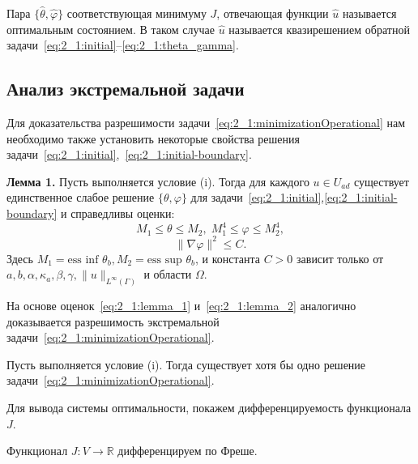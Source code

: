 Пара $\{\hat{\theta}, \hat{\varphi} \}$ соответствующая минимуму $J$,
отвечающая функции $\hat{u}$ называется оптимальным состоянием.
В таком случае $\hat{u}$ называется квазирешением обратной
задачи~\eqref{eq:2_1:initial}--\eqref{eq:2_1:theta_gamma}.

\subsection{Анализ экстремальной задачи}\label{subsec:ch2/sec1/subsec3}


Для доказательства разрешимости задачи~\eqref{eq:2_1:minimizationOperational}
нам необходимо также установить некоторые свойства
решения задачи~\eqref{eq:2_1:initial},~\eqref{eq:2_1:initial-boundary}.

\textbf{Лемма 1.}
Пусть выполняется условие (i).
Тогда для каждого $ u \in U_{ad} $ существует единственное слабое решение
$\{\theta, \varphi \}$ для задачи~\eqref{eq:2_1:initial},\eqref{eq:2_1:initial-boundary}
и справедливы оценки:
\begin{equation}
    \label{eq:2_1:lemma_1}
    M_1 \le \theta \le M_2, \; M_1^4 \le \varphi \le M_2^4,
\end{equation}
\begin{equation}
    \label{eq:2_1:lemma_2}
    \| \nabla \varphi \|^2 \le C.
\end{equation}
Здесь $M_1 = \text{ess inf } \theta_b, M_2 = \text{ess sup } \theta_b$, и константа $C > 0$ зависит
только от \\ $a, b, \alpha, \kappa_a, \beta, \gamma, \|u\|_{L^\infty(\Gamma)}$ и области $\Omega$.

На основе оценок~\eqref{eq:2_1:lemma_1} и~\eqref{eq:2_1:lemma_2}
аналогично~\cite{Kovtanyuk2014TheoreticalAnalysis}
доказывается разрешимость экстремальной
задачи~\eqref{eq:2_1:minimizationOperational}.


\begin{theorem}
    \label{th:2_1:1}
    Пусть выполняется условие (i).
    Тогда существует хотя бы одно решение задачи~\eqref{eq:2_1:minimizationOperational}.
\end{theorem}

Для вывода системы оптимальности, покажем дифференцируемость функционала $J$.
\begin{lemma}
    \label{lm:2_1:freshet_diff}
    Функционал $J : V \rightarrow \mathbb{R}$ дифференцируем по Фреше.
\end{lemma}

